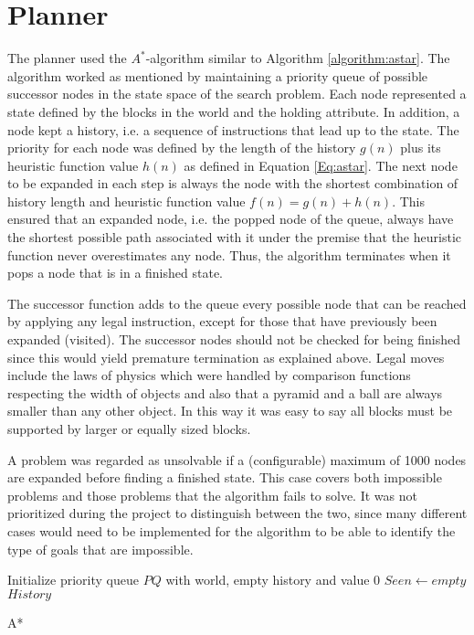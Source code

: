 \section{Planner} 

The planner used the $A^*$-algorithm similar to Algorithm \ref{algorithm:astar}.
The algorithm worked as mentioned by maintaining a priority queue of possible
successor nodes in the state space of the search problem. Each node represented a
state defined by the blocks in the world and the holding attribute. In addition,
a node kept a history, i.e. a sequence of instructions that lead up to the
state. The priority for each node was defined by the length of the history $g(n)$
plus its heuristic function value $h(n)$ as defined in Equation \ref{Eq:astar}.
The next node to be expanded in each step is always the node with the shortest
combination of history length and heuristic function value $f(n) = g(n) + h(n)$.
This ensured that an expanded node, i.e. the popped node of the queue, always
have the shortest possible path associated with it under the premise that the
heuristic function never overestimates any node. Thus, the algorithm terminates
when it pops a node that is in a finished state. 

The successor function adds to the queue every possible node that can be reached
by applying any legal instruction, except for those that have previously been
expanded (visited). The successor nodes should not be checked for being finished
since this would yield premature termination as explained above. Legal moves
include the laws of physics which were handled by comparison functions
respecting the width of objects and also that a pyramid and a ball are always
smaller than any other object. In this way it was easy to say all blocks must be
supported by larger or equally sized blocks.

A problem was regarded as unsolvable if a (configurable) maximum of 1000 nodes
are expanded before finding a finished state. This case covers both impossible
problems and those problems that the algorithm fails to solve. It was not
prioritized during the project to distinguish between the two, since many
different cases would need to be implemented for the algorithm to be able to
identify the type of goals that are impossible. 

\begin{algorithm}[h!]
 \SetAlgoLined
 Initialize priority queue $PQ$ with world, empty history and value 0\;
 $Seen \leftarrow empty$\;
 \Return $History$
 \caption{A*}
 \label{algorithm:astar}
\end{algorithm} 


